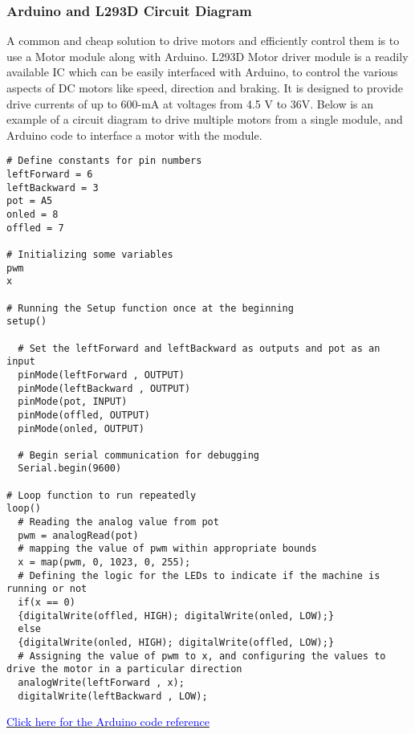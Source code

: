 \documentclass[table,french,english]{rapportCS}
\begin{document}
\subsubsection{Arduino and L293D Circuit Diagram}\label{sec:adriono}
A common and cheap solution to drive motors and efficiently control them is to use a Motor   module along with Arduino. L293D Motor driver module is a readily available IC which can be easily interfaced with Arduino, to control the various aspects of DC motors like speed, direction and braking. It is designed to provide  drive currents of up to 600-mA at voltages from 4.5 V to 36V.
Below is an example of a circuit diagram to drive multiple motors from a single module, and Arduino code to interface a motor with the module.


\begin{lstlisting}
# Define constants for pin numbers
leftForward = 6
leftBackward = 3
pot = A5
onled = 8
offled = 7

# Initializing some variables
pwm
x

# Running the Setup function once at the beginning
setup() 

  # Set the leftForward and leftBackward as outputs and pot as an input
  pinMode(leftForward , OUTPUT)
  pinMode(leftBackward , OUTPUT)
  pinMode(pot, INPUT)
  pinMode(offled, OUTPUT)
  pinMode(onled, OUTPUT)

  # Begin serial communication for debugging
  Serial.begin(9600)

# Loop function to run repeatedly
loop()
  # Reading the analog value from pot
  pwm = analogRead(pot)
  # mapping the value of pwm within appropriate bounds
  x = map(pwm, 0, 1023, 0, 255);
  # Defining the logic for the LEDs to indicate if the machine is running or not
  if(x == 0)
  {digitalWrite(offled, HIGH); digitalWrite(onled, LOW);}
  else 
  {digitalWrite(onled, HIGH); digitalWrite(offled, LOW);}
  # Assigning the value of pwm to x, and configuring the values to drive the motor in a particular direction 
  analogWrite(leftForward , x);
  digitalWrite(leftBackward , LOW);

\end{lstlisting}
\href{https://github.com/naunidhsingh03/ELP305-Tribe-D/blob/4dd27c670ba154f7fe8a9ef2a248e11971be9053/Codes/final_roller.ino}
{\textcolor{blue}{Click here for the Arduino code reference}}
\end{document}
